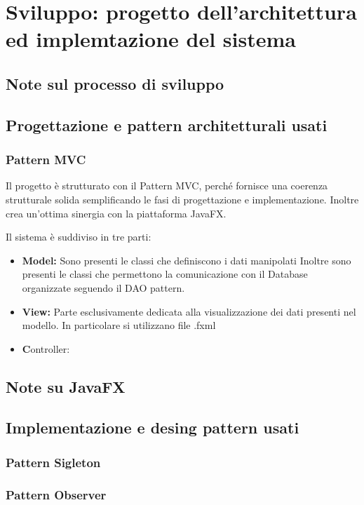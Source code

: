 \documentclass{article}
\begin{document}
\section{Sviluppo: progetto dell'architettura ed implemtazione del sistema}
\subsection{Note sul processo di sviluppo}
\subsection{Progettazione e pattern architetturali usati}
\subsubsection{Pattern MVC}
Il progetto è strutturato con il Pattern MVC, perché fornisce una coerenza strutturale solida 
semplificando le fasi di progettazione e implementazione. Inoltre crea un'ottima sinergia con la
piattaforma JavaFX.


Il sistema è suddiviso in tre parti:
\begin{itemize}
    \item{\textbf{Model:}
            Sono presenti le classi che definiscono i dati manipolati
            Inoltre sono presenti le classi che permettono la comunicazione
            con il Database organizzate seguendo il DAO pattern.
        }
    \item{\textbf{View:}
            Parte esclusivamente dedicata alla visualizzazione dei dati
            presenti nel modello.
            In particolare si utilizzano file .fxml
        }
    \item{\textbf Controller:}
\end{itemize}
\subsection{Note su JavaFX}
\subsection{Implementazione e desing pattern usati}
\subsubsection{Pattern Sigleton}
\subsubsection{Pattern Observer}
\end{document}

